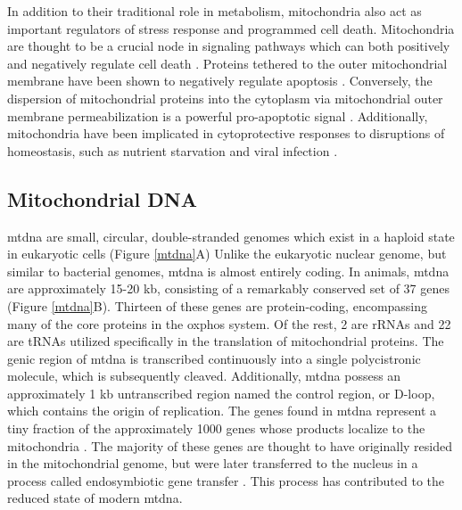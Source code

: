 \documentclass[12pt,twoside]{reedthesis}
\begin{document}
In addition to their traditional role in metabolism, mitochondria also act as important regulators of stress response and programmed cell death.
Mitochondria are thought to be a crucial node in signaling pathways which can both positively and negatively regulate cell death \citep{galluzzi_mitochondria:_2012}.
Proteins tethered to the outer mitochondrial membrane have been shown to negatively regulate apoptosis \citep{hengartner_caenorhabditis_1992}.
Conversely, the dispersion of mitochondrial proteins into the cytoplasm via mitochondrial outer membrane permeabilization is a powerful pro-apoptotic signal \citep{zamzami_reduction_1995, tait_mitochondria_2010}.
Additionally, mitochondria have been implicated in cytoprotective responses to disruptions of homeostasis, such as nutrient starvation \citep{gomes_during_2011} and viral infection \citep{arnoult_mitochondria_2011}.

\subsection{Mitochondrial DNA}
\gls{mtdna} are small, circular, double-stranded genomes which exist in a haploid state in eukaryotic cells (Figure \ref{mtdna}A)
Unlike the eukaryotic nuclear genome, but similar to bacterial genomes, \gls{mtdna} is almost entirely coding.
In animals, \gls{mtdna} are approximately 15-20 kb, consisting of a remarkably conserved set of 37 genes (Figure \ref{mtdna}B).
Thirteen of these genes are protein-coding, encompassing many of the core proteins in the \gls{oxphos} system.
Of the rest, 2 are rRNAs and 22 are tRNAs utilized specifically in the translation of mitochondrial proteins.
The genic region of \gls{mtdna} is transcribed continuously into a single polycistronic molecule, which is subsequently cleaved.
Additionally, \gls{mtdna} possess an approximately 1 kb untranscribed region named the control region, or D-loop, which contains the origin of replication.
The genes found in \gls{mtdna} represent a tiny fraction of the approximately 1000 genes whose products localize to the mitochondria \citep{pagliarini_mitochondrial_2008}.
The majority of these genes are thought to have originally resided in the mitochondrial genome, but were later transferred to the nucleus in a process called endosymbiotic gene transfer \citep{timmis_endosymbiotic_2004}.
This process has contributed to the reduced state of modern \gls{mtdna}. 
\end{document}
